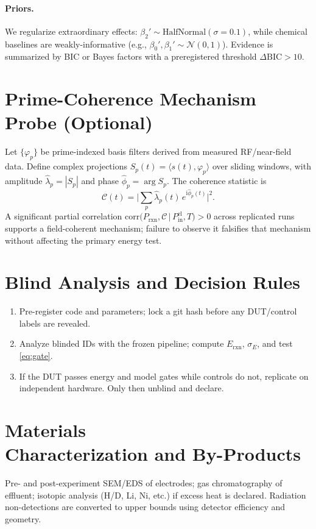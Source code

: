 \documentclass[11pt]{article}
\theoremstyle{remark}
\begin{document}
\paragraph{Priors.} We regularize extraordinary effects: $\beta_2' \sim \mathrm{HalfNormal}(\sigma=0.1)$, while chemical baselines are weakly-informative (e.g., $\beta_0',\beta_1'\sim \mathcal{N}(0,1)$). Evidence is summarized by BIC or Bayes factors with a preregistered threshold $\Delta\mathrm{BIC}>10$.

\section{Prime-Coherence Mechanism Probe (Optional)}
Let $\{\varphi_p\}$ be prime-indexed basis filters derived from measured RF/near-field data. Define complex projections $S_p(t)=\langle s(t),\varphi_p\rangle$ over sliding windows, with amplitude $\hat\lambda_p=|S_p|$ and phase $\hat\phi_p=\arg S_p$. The coherence statistic is
\begin{equation}
\mathcal{C}(t) = \Big|\sum_{p} \hat\lambda_p(t)\,e^{\mathrm{i}\hat\phi_p(t)}\Big|^2.
\end{equation}
A significant partial correlation $\mathrm{corr}\big(P_{\mathrm{rxn}},\mathcal{C}\,|\,P_{\mathrm{in}}^{\mathrm{el}},T\big)>0$ across replicated runs supports a field-coherent mechanism; failure to observe it falsifies that mechanism without affecting the primary energy test.

\section{Blind Analysis and Decision Rules}
\begin{enumerate}[label=\textbf{D\arabic*.}]
  \item Pre-register code and parameters; lock a git hash before any DUT/control labels are revealed.
  \item Analyze blinded IDs with the frozen pipeline; compute $E_{\mathrm{rxn}}$, $\sigma_E$, and test \eqref{eq:gate}.
  \item If the DUT passes energy and model gates while controls do not, replicate on independent hardware. Only then unblind and declare.
\end{enumerate}

\section{Materials \\ Characterization and By-Products}
Pre- and post-experiment SEM/EDS of electrodes; gas chromatography of effluent; isotopic analysis (H/D, Li, Ni, etc.) if excess heat is declared. Radiation non-detections are converted to upper bounds using detector efficiency and geometry.
\end{document}
